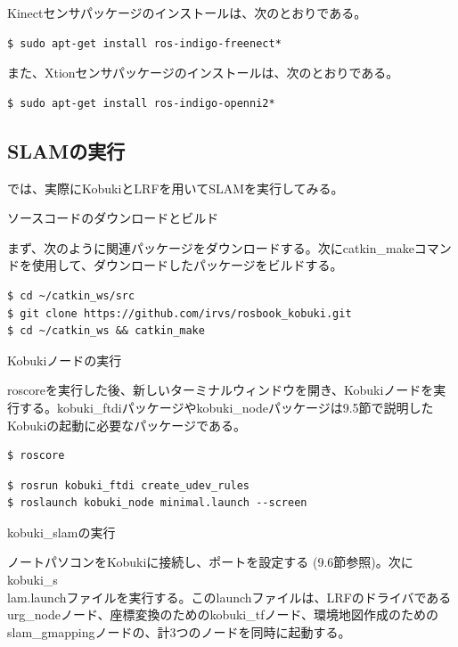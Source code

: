 Kinectセンサパッケージのインストールは、次のとおりである。

\begin{lstlisting}[language=ROS]
$ sudo apt-get install ros-indigo-freenect*
\end{lstlisting}

また、Xtionセンサパッケージのインストールは、次のとおりである。

\begin{lstlisting}[language=ROS]
$ sudo apt-get install ros-indigo-openni2*
\end{lstlisting}

\subsection{SLAMの実行}

では、実際にKobukiとLRFを用いてSLAMを実行してみる。

\setcounter{num}{0}

\circled{\thenum} ソースコードのダウンロードとビルド

まず、次のように関連パッケージをダウンロードする。次にcatkin\_makeコマンドを使用して、ダウンロードしたパッケージをビルドする。

\begin{lstlisting}[language=ROS]
$ cd ~/catkin_ws/src
$ git clone https://github.com/irvs/rosbook_kobuki.git
$ cd ~/catkin_ws && catkin_make
\end{lstlisting}

\circled{\thenum} Kobukiノードの実行

roscoreを実行した後、新しいターミナルウィンドウを開き、Kobukiノードを実行する。kobuki\_ftdiパッケージやkobuki\_nodeパッケージは9.5節で説明したKobukiの起動に必要なパッケージである。

\begin{lstlisting}[language=ROS]
$ roscore
\end{lstlisting}

\begin{lstlisting}[language=ROS]
$ rosrun kobuki_ftdi create_udev_rules
$ roslaunch kobuki_node minimal.launch --screen
\end{lstlisting}

\circled{\thenum} kobuki\_slamの実行

ノートパソコンをKobukiに接続し、ポートを設定する (9.6節参照)。次にkobuki\_s\\lam.launchファイルを実行する。このlaunchファイルは、LRFのドライバであるurg\_nodeノード、座標変換のためのkobuki\_tfノード、環境地図作成のためのslam\_gmappingノードの、計3つのノードを同時に起動する。

